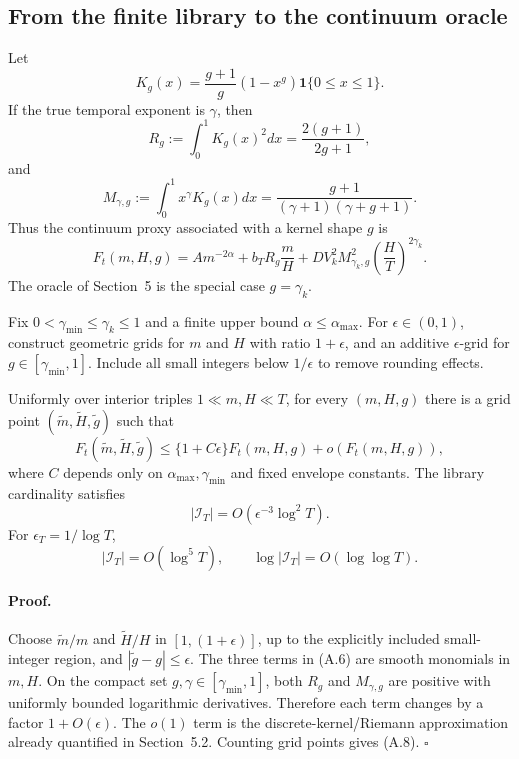 \subsection{From the finite library to the continuum oracle}

Let
\[
 K_g(x)=\frac{g+1}{g}(1-x^g)\mathbf 1\{0\le x\le1\}.
\]
If the true temporal exponent is \(\gamma\), then
\[
 R_g:=\int_0^1K_g(x)^2dx=\frac{2(g+1)}{2g+1},
\]
and
\[
 M_{\gamma,g}:=\int_0^1x^\gamma K_g(x)dx
 =
 \frac{g+1}{(\gamma+1)(\gamma+g+1)}.
\]
Thus the continuum proxy associated with a kernel shape \(g\) is
\[
 F_t(m,H,g)
 =
 Am^{-2\alpha}
 +b_TR_g\frac mH
 +DV_k^2M_{\gamma_k,g}^2
 \left(\frac HT\right)^{2\gamma_k}.
 \tag{A.6}
\]
The oracle of Section~5 is the special case \(g=\gamma_k\).

Fix \(0<\gamma_{\min}\le\gamma_k\le1\) and a finite upper bound
\(\alpha\le\alpha_{\max}\).  For \(\epsilon\in(0,1)\), construct geometric
grids for \(m\) and \(H\) with ratio \(1+\epsilon\), and an additive
\(\epsilon\)-grid for \(g\in[\gamma_{\min},1]\).  Include all small integers
below \(1/\epsilon\) to remove rounding effects.

\begin{proposition}
\label{prop:continuum-grid}
Uniformly over interior triples
\(1\ll m,H\ll T\), for every
\((m,H,g)\) there is a grid point
\((\widetilde m,\widetilde H,\widetilde g)\) such that
\[
 F_t(\widetilde m,\widetilde H,\widetilde g)
 \le
 \{1+C\epsilon\}F_t(m,H,g)+o(F_t(m,H,g)),
 \tag{A.7}
\]
where \(C\) depends only on
\(\alpha_{\max},\gamma_{\min}\) and fixed envelope constants.
The library cardinality satisfies
\[
 |\mathcal I_T|
 =
 O\!\left(\epsilon^{-3}\log^2 T\right).
 \tag{A.8}
\]
For \(\epsilon_T=1/\log T\),
\[
 |\mathcal I_T|=O(\log^5T),
 \qquad
 \log|\mathcal I_T|=O(\log\log T).
\]
\end{proposition}

\paragraph{Proof.}
Choose \(\widetilde m/m\) and \(\widetilde H/H\) in
\([1,(1+\epsilon)]\), up to the explicitly included small-integer region, and
\(|\widetilde g-g|\le\epsilon\).  The three terms in (A.6) are smooth monomials
in \(m,H\).  On the compact set
\(g,\gamma\in[\gamma_{\min},1]\), both \(R_g\) and
\(M_{\gamma,g}\) are positive with uniformly bounded logarithmic derivatives.
Therefore each term changes by a factor \(1+O(\epsilon)\).  The \(o(1)\)
term is the discrete-kernel/Riemann approximation already quantified in
Section~5.2.  Counting grid points gives (A.8). \(\square\)

